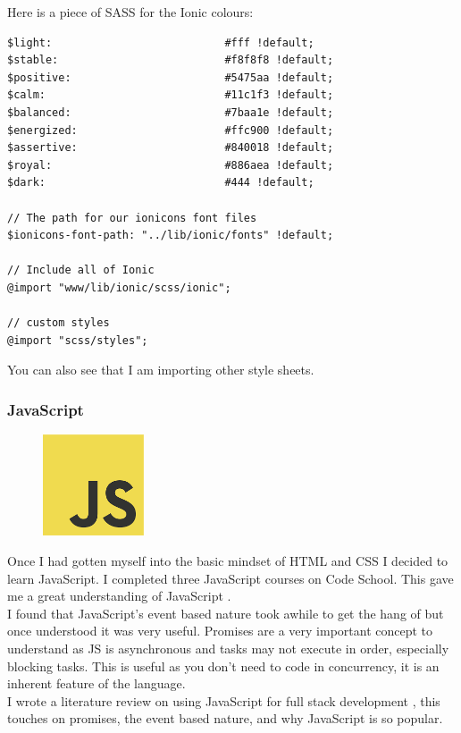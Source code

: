 Here is a piece of SASS for the Ionic colours:
\begin{verbatim}
$light:                           #fff !default;
$stable:                          #f8f8f8 !default;
$positive:                        #5475aa !default; 
$calm:                            #11c1f3 !default;
$balanced:                        #7baa1e !default; 
$energized:                       #ffc900 !default;
$assertive:                       #840018 !default;
$royal:                           #886aea !default;
$dark:                            #444 !default;

// The path for our ionicons font files
$ionicons-font-path: "../lib/ionic/fonts" !default;

// Include all of Ionic
@import "www/lib/ionic/scss/ionic";

// custom styles
@import "scss/styles";
\end{verbatim}
You can also see that I am importing other style sheets.


\subsubsection{JavaScript}
\begin{figure}
\includegraphics[width=3cm]{img/mobile-app/logos/JS.png}
\end{figure} 
Once I had gotten myself into the basic mindset of HTML and CSS I decided to learn JavaScript.
I completed three JavaScript courses \cite{codeschool_js} on Code  School.
This gave me a great understanding of JavaScript \cite{javascript}.
\\
I found that JavaScript's event based nature took awhile to get the hang of but once understood it was very useful. 
Promises are a very important concept to understand as JS is asynchronous and tasks may not execute in order, especially blocking tasks.
This is useful as you don't need to code in concurrency, it is an inherent feature of the language.
\\
I wrote a literature review on using JavaScript for full stack development \cite{js_advantages_full_stack}, this touches on promises, the event based nature, and why JavaScript is so popular.

